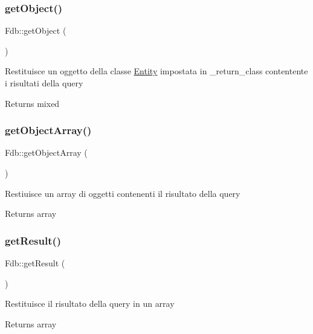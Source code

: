 \subsubsection{\texorpdfstring{get\+Object()}{getObject()}}
{\footnotesize\ttfamily Fdb\+::get\+Object (\begin{DoxyParamCaption}{ }\end{DoxyParamCaption})}

Restituisce un oggetto della classe \mbox{\hyperlink{namespace_entity}{Entity}} impostata in \+\_\+return\+\_\+class contentente i risultati della query

\begin{DoxyReturn}{Returns}
mixed 
\end{DoxyReturn}
\mbox{\label{class_fdb_ae08a72eb89fb8be9aab10ebc11e9434c}} 
\subsubsection{\texorpdfstring{get\+Object\+Array()}{getObjectArray()}}
{\footnotesize\ttfamily Fdb\+::get\+Object\+Array (\begin{DoxyParamCaption}{ }\end{DoxyParamCaption})}

Restiuisce un array di oggetti contenenti il risultato della query

\begin{DoxyReturn}{Returns}
array 
\end{DoxyReturn}
\mbox{\label{class_fdb_a6fcc3963a986e2c75a5573fd5fc29604}} 
\subsubsection{\texorpdfstring{get\+Result()}{getResult()}}
{\footnotesize\ttfamily Fdb\+::get\+Result (\begin{DoxyParamCaption}{ }\end{DoxyParamCaption})}

Restituisce il risultato della query in un array

\begin{DoxyReturn}{Returns}
array 
\end{DoxyReturn}
\mbox{\label{class_fdb_a75e9d7f73285b64c4071d72f593ea8cf}} 
